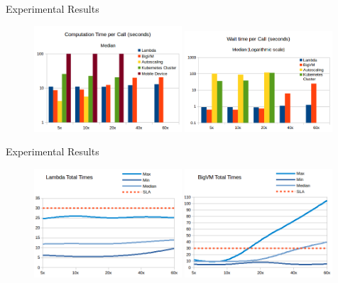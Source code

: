 \documentclass[pdf,10pt]{beamer}
\begin{document}
\begin{frame}{Experimental Results}

\begin{figure}
   \includegraphics[width=0.49\textwidth]{img/2.png}
   \hfill
   \includegraphics[width=0.49\textwidth]{img/3.png}
\end{figure}

\end{frame}


\begin{frame}{Experimental Results}

\begin{figure}
   \includegraphics[width=0.49\textwidth]{img/4.png}
   \hfill
   \includegraphics[width=0.49\textwidth]{img/5.png}
\end{figure}

\end{frame}
\end{document}
